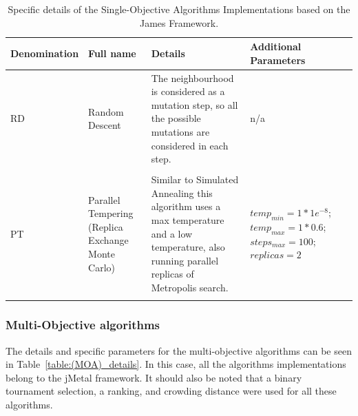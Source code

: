 \par
\begin{table}[H]
    \begin{tabular}{p{}p{}p{}p{}p{}}
    \hline
    Denomination  & Full name & Details & Additional Parameters 
    \\
    \hline
    RD & Random Descent & The neighbourhood is considered as a mutation step, so all the possible mutations are considered in each step. & n/a \\ \\
    PT & Parallel Tempering (Replica Exchange Monte Carlo) & Similar to Simulated Annealing this algorithm uses a max temperature and a low temperature, also running parallel replicas of Metropolis search.& $temp_{min} = 1 * 1e^{-8}$;$temp_{max} = 1 * 0.6$; $steps_{max} = 100$; $replicas = 2$ \\ \\
    \hline
    \end{tabular}
    \caption{Specific details of the Single-Objective Algorithms Implementations based on the James Framework.}
    \label{table:(SOA)_details_james}
\end{table}

\subsubsection{Multi-Objective algorithms}

The details and specific parameters for the multi-objective algorithms can be seen in Table~\ref{table:(MOA)_details}. In this case, all the algorithms implementations belong to the jMetal framework. It should also be noted that a binary tournament selection, a ranking, and crowding distance were used for all these algorithms.

